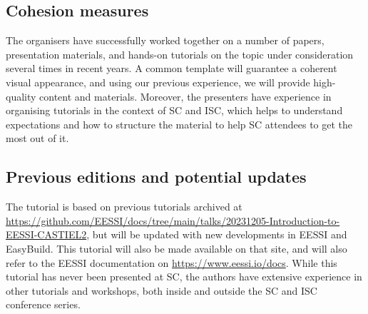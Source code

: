 \subsection*{Cohesion measures}
The organisers have successfully worked together on a number of papers, presentation materials,
and hands-on tutorials on the topic under consideration several times in recent years.
A common template
will guarantee
a coherent visual appearance, and using our previous experience, we will provide high-quality content and materials.
Moreover, the presenters have experience in organising tutorials in the context of SC and ISC, which helps to understand
expectations
and how to structure the material
to help SC attendees to get the most out of it.

\subsection*{Previous editions and potential updates}
The tutorial is based on previous tutorials archived at
\url{https://github.com/EESSI/docs/tree/main/talks/20231205-Introduction-to-EESSI-CASTIEL2},
but will be updated with new developments in EESSI and EasyBuild.
This tutorial will also be made available on that site, and will also refer to the EESSI documentation on
\url{https://www.eessi.io/docs}.
While this tutorial has never been presented at SC, the authors have extensive
experience in other tutorials and workshops, both inside and outside the SC and ISC conference series.
